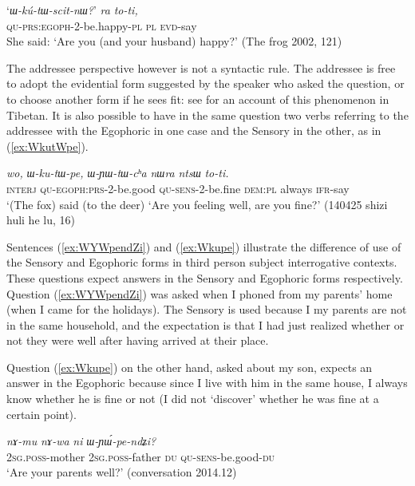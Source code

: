 \documentclass[oldfontcommands,oneside,a4paper,11pt]{article}
\newcommand{\ipa}[1]{{\phon\textit{#1}}} %
\newcommand{\refb}[1]{(\ref{#1})}
\begin{document}
\begin{exe}
\ex \label{ex:WkutWscitnW}
\gll	`\ipa{ɯ-kú-tɯ-scit-nɯ?}' 	\ipa{ra} 	\ipa{to-ti,} \\
  \textsc{qu-prs:egoph}-2-be.happy-\textsc{pl} \textsc{pl} \textsc{evd}-say \\
\glt She said: `Are you (and your husband) happy?' (The frog 2002, 121)
\end{exe}



The addressee perspective however is not a syntactic rule. The addressee is free to adopt the evidential form suggested by the speaker who asked the question, or to choose another form if he sees fit: see \citealt{garrett07symbiosis} for an account of this phenomenon in Tibetan. It is also possible to have in the same question two verbs referring to the addressee with the Egophoric in one case and the Sensory in the other, as in \refb{ex:WkutWpe}. 

\begin{exe}
\ex \label{ex:WkutWpe}
\gll 
\ipa{wo,} 	\ipa{ɯ-ku-tɯ-pe,} 	\ipa{ɯ-ɲɯ-tɯ-cʰa} 	\ipa{nɯra} 	\ipa{ntsɯ} 	\ipa{to-ti.} \\
\textsc{interj} \textsc{qu-egoph:prs}-2-be.good \textsc{qu-sens}-2-be.fine \textsc{dem:pl} always \textsc{ifr}-say  \\
\glt `(The fox) said (to the deer) `Are you feeling well, are you fine?' (140425 shizi huli he lu, 16)
\end{exe}

Sentences \refb{ex:WYWpendZi} and \refb{ex:Wkupe} illustrate the difference of use of the Sensory and Egophoric forms in third person subject interrogative contexts. These questions expect answers in the Sensory and Egophoric forms respectively. Question \refb{ex:WYWpendZi} was asked when I phoned from my parents' home (when I came for the holidays). The Sensory is used because I my parents are not in the same household, and the expectation is that I had just realized whether or not they were well after having arrived at their place. 

Question \refb{ex:Wkupe} on the other hand, asked about my son, expects an answer in the Egophoric because since I live with him in the same house, I always know whether he is fine or not (I did not `discover' whether he was fine at a certain point).

\begin{exe}
\ex \label{ex:WYWpendZi}
\gll 
\ipa{nɤ-mu}  	\ipa{nɤ-wa}  	\ipa{ni}  	\ipa{ɯ-ɲɯ́-pe-ndʑi?}  \\
\textsc{2sg.poss}-mother \textsc{2sg.poss}-father \textsc{du} \textsc{qu-sens}-be.good-\textsc{du} \\
\glt `Are your parents well?' (conversation 2014.12)
\end{exe}
\end{document}
